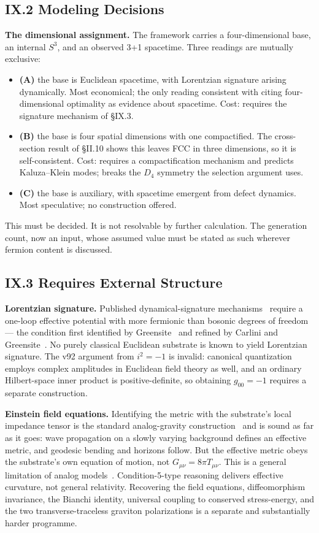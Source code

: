 \documentclass[11pt,a4paper]{article}
\begin{document}
\subsection{IX.2 Modeling Decisions}
\textbf{The dimensional assignment.} The framework carries a four-dimensional base, an internal $S^3$, and an observed 3+1 spacetime. Three readings are mutually exclusive:
\begin{itemize}
\item \textbf{(A)} the base is Euclidean spacetime, with Lorentzian signature arising dynamically. Most economical; the only reading consistent with citing four-dimensional optimality as evidence about spacetime. Cost: requires the signature mechanism of \S IX.3.
\item \textbf{(B)} the base is four spatial dimensions with one compactified. The cross-section result of \S II.10 shows this leaves FCC in three dimensions, so it is self-consistent. Cost: requires a compactification mechanism and predicts Kaluza--Klein modes; breaks the $D_4$ symmetry the selection argument uses.
\item \textbf{(C)} the base is auxiliary, with spacetime emergent from defect dynamics. Most speculative; no construction offered.
\end{itemize}
This must be decided. It is not resolvable by further calculation. The generation count, now an input, whose assumed value must be stated as such wherever fermion content is discussed.

\subsection{IX.3 Requires External Structure}
\textbf{Lorentzian signature.} Published dynamical-signature mechanisms~\cite{mukohyama2013,kehayias2014} require a one-loop effective potential with more fermionic than bosonic degrees of freedom --- the condition first identified by Greensite~\cite{greensite1993} and refined by Carlini and Greensite~\cite{carlini1994}. No purely classical Euclidean substrate is known to yield Lorentzian signature. The v92 argument from $i^2 = -1$ is invalid: canonical quantization employs complex amplitudes in Euclidean field theory as well, and an ordinary Hilbert-space inner product is positive-definite, so obtaining $g_{00} = -1$ requires a separate construction.

\textbf{Einstein field equations.} Identifying the metric with the substrate's local impedance tensor is the standard analog-gravity construction~\cite{barcelo2011} and is sound as far as it goes: wave propagation on a slowly varying background defines an effective metric, and geodesic bending and horizons follow. But the effective metric obeys the substrate's own equation of motion, not $G_{\mu\nu} = 8\pi T_{\mu\nu}$. This is a general limitation of analog models~\cite{sindoni2012}. Condition-5-type reasoning delivers effective curvature, not general relativity. Recovering the field equations, diffeomorphism invariance, the Bianchi identity, universal coupling to conserved stress-energy, and the two transverse-traceless graviton polarizations is a separate and substantially harder programme.
\end{document}
